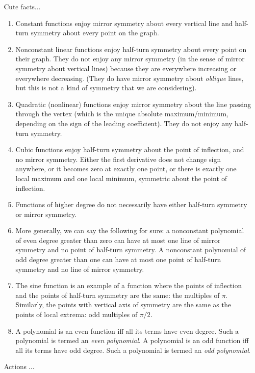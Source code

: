 \documentclass[10pt]{amsart}
\begin{document}
Cute facts...

\begin{enumerate}
\item Constant functions enjoy mirror symmetry about every vertical
  line and half-turn symmetry about every point on the graph.
\item Nonconstant linear functions enjoy half-turn symmetry about
  every point on their graph. They do not enjoy any mirror symmetry
  (in the sense of mirror symmetry about vertical lines) because they
  are everywhere increasing or everywhere decreasing. (They do have
  mirror symmetry about {\em oblique} lines, but this is not a kind of
  symmetry that we are considering).
\item Quadratic (nonlinear) functions enjoy mirror symmetry about the
  line passing through the vertex (which is the unique absolute
  maximum/minimum, depending on the sign of the leading
  coefficient). They do not enjoy any half-turn symmetry.
\item Cubic functions enjoy half-turn symmetry about the point of
  inflection, and no mirror symmetry. Either the first derivative does
  not change sign anywhere, or it becomes zero at exactly one point,
  or there is exactly one local maximum and one local minimum,
  symmetric about the point of inflection.
\item Functions of higher degree do not necessarily have either
  half-turn symmetry or mirror symmetry.
\item More generally, we can say the following for sure: a nonconstant
  polynomial of even degree greater than zero can have at most one
  line of mirror symmetry and no point of half-turn symmetry. A
  nonconstant polynomial of odd degree greater than one can have at
  most one point of half-turn symmetry and no line of mirror symmetry.
\item The sine function is an example of a function where the points
  of inflection and the points of half-turn symmetry are the same: the
  multiples of $\pi$. Similarly, the points with vertical axis of
  symmetry are the same as the points of local extrema: odd multiples
  of $\pi/2$.
\item A polynomial is an even function iff all its terms have even
  degree. Such a polynomial is termed an {\em even polynomial}. A
  polynomial is an odd function iff all its terms have odd
  degree. Such a polynomial is termed an {\em odd polynomial}.
\end{enumerate}

Actions ...
\end{document}
